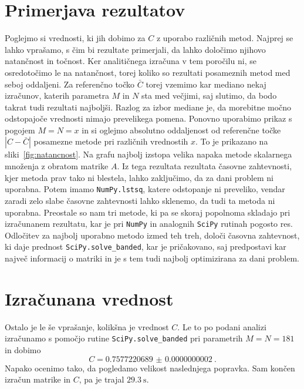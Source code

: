 \documentclass[notoc]{porocilo}
\begin{document}
\section{Primerjava rezultatov}
Poglejmo si vrednosti, ki jih dobimo za $C$ z uporabo različnih metod. Najprej se lahko vprašamo, s čim bi rezultate primerjali, da lahko določimo njihovo natančnost in točnost. Ker analitičnega izračuna v tem poročilu ni, se osredotočimo le na natančnost, torej koliko so rezultati posameznih metod med seboj oddaljeni. Za referenčno točko $\bar{C}$ torej vzemimo kar mediano nekaj izračunov, katerih parametra $M$ in $N$ sta med večjimi, saj slutimo, da bodo takrat tudi rezultati najboljši. Razlog za izbor mediane je, da morebitne močno odstopajoče vrednosti nimajo prevelikega pomena. Ponovno uporabimo prikaz s pogojem $M = N = x$ in si oglejmo absolutno oddaljenost od referenčne točke $|C - \bar{C}|$ posamezne metode pri različnih vrednostih $x$. To je prikazano na sliki~\ref{fig:natancnost}.
Na grafu najbolj izstopa velika napaka metode skalarnega množenja z obratom matrike $A$. Iz tega rezultata rezultata časovne zahtevnosti, kjer metoda prav tako ni blestela, lahko zaključimo, da za dani problem ni uporabna. Potem imamo \texttt{NumPy.lstsq}, katere odstopanje ni preveliko, vendar zaradi zelo slabe časovne zahtevnosti lahko sklenemo, da tudi ta metoda ni uporabna. Preostale so nam tri metode, ki pa se skoraj popolnoma skladajo pri izračunanem rezultatu, kar je pri \texttt{NumPy} in analognih \texttt{SciPy} rutinah pogosto res. Odločitev za najbolj uporabno metodo izmed teh treh, določi časovna zahtevnost, ki daje prednost \texttt{SciPy.solve\_banded}, kar je pričakovano, saj predpostavi kar največ informacij o matriki in je s tem tudi najbolj optimizirana za dani problem.

\section{Izračunana vrednost}
Ostalo je le še vprašanje, kolikšna je vrednost $C$. Le to po podani analizi izračunamo s pomočjo rutine \texttt{SciPy.solve\_banded} pri parametrih $M = N = 181$ in dobimo
\begin{equation*}
    C = \num{0.7577220689(2)} \>.
\end{equation*}
Napako ocenimo tako, da pogledamo velikost naslednjega popravka. Sam končen izračun matrike in $C$, pa je trajal $\SI{29.3}{\second}$.
\end{document}
